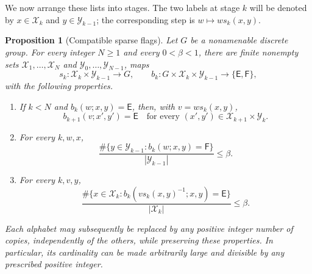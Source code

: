 \documentclass[11pt]{article}
\numberwithin{equation}{section}
\newtheorem{proposition}[theorem]{Proposition}
\theoremstyle{definition}
\theoremstyle{remark}
\newcommand{\E}{\mathsf E}
\newcommand{\F}{\mathsf F}
\begin{document}
We now arrange these lists into stages.  The two labels at stage $k$
will be denoted by $x\in\mathcal X_k$ and
$y\in\mathcal Y_{k-1}$; the corresponding step is
$w\longmapsto w s_k(x,y)$.

\begin{proposition}[Compatible sparse flags]\label{prop:flags}
Let $G$ be a nonamenable discrete group.  For every integer $N\geq1$
and every $0<\beta<1$, there are finite nonempty sets
$\mathcal X_1,\ldots,\mathcal X_N$ and
$\mathcal Y_0,\ldots,\mathcal Y_{N-1}$, maps
\[
 s_k:\mathcal X_k\times\mathcal Y_{k-1}\longrightarrow G,
 \qquad
 b_k:G\times\mathcal X_k\times\mathcal Y_{k-1}
       \longrightarrow\{\E,\F\},
\]
with the following properties.
\begin{enumerate}
\item[\textup{(F1)}] If $k<N$ and $b_k(w;x,y)=\E$, then, with
$v=w s_k(x,y)$,
\[
 b_{k+1}(v;x',y')=\E
 \quad\text{for every }(x',y')\in
            \mathcal X_{k+1}\times\mathcal Y_k.
\]
\item[\textup{(F2)}] For every $k,w,x$,
\[
 \frac{\#\{y\in\mathcal Y_{k-1}:b_k(w;x,y)=\F\}}
      {|\mathcal Y_{k-1}|}\leq\beta.
\]
\item[\textup{(F3)}] For every $k,v,y$,
\[
 \frac{\#\{x\in\mathcal X_k:
          b_k(v s_k(x,y)^{-1};x,y)=\E\}}
      {|\mathcal X_k|}\leq\beta.
\]
\end{enumerate}
Each alphabet may subsequently be replaced by any positive integer
number of copies, independently of the others, while preserving these
properties.  In particular, its cardinality can be made arbitrarily
large and divisible by any prescribed positive integer.
\end{proposition}
\end{document}
